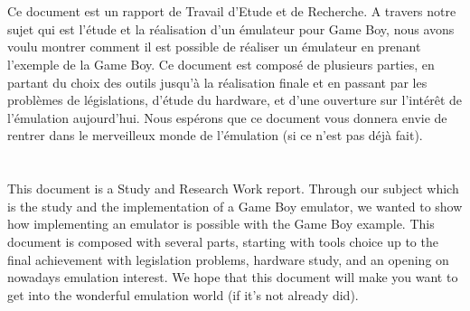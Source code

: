 \documentclass[french]{report}
\begin{document}
\section*{}
\vspace{2cm}
Ce document est un rapport de Travail d'Etude et de Recherche. A travers notre sujet qui est l'étude et la réalisation d'un émulateur pour Game Boy, nous avons voulu montrer comment il est possible de réaliser un émulateur en prenant l'exemple de la Game Boy. Ce document est composé de plusieurs parties, en partant du choix des outils jusqu'à la réalisation finale et en passant par les problèmes de législations, d'étude du hardware, et d'une ouverture sur l'intérêt de l'émulation aujourd'hui. Nous espérons que ce document vous donnera envie de rentrer dans le merveilleux monde de l'émulation (si ce n'est pas déjà fait). 
\\\\\\
This document is a Study and Research Work report. Through our subject which is the study and the implementation of a Game Boy emulator, we wanted to show how implementing an emulator is possible with the Game Boy example. This document is composed with several parts, starting with tools choice up to the final achievement with legislation problems, hardware study, and an opening on nowadays emulation interest. We hope that this document will make you want to get into the wonderful emulation world (if it's not already did).
\end{document}
